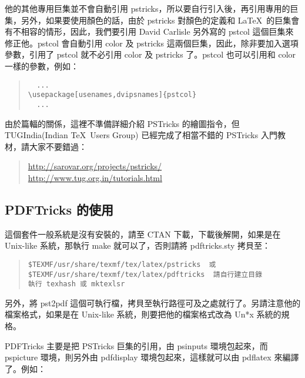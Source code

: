 他的其他專用巨集並不會自動引用 {\sffamily pstricks}，所以要自行引入後，再引用專用的巨集，另外，如果要使用顏色的話，由於 {\sffamily pstricks} 對顏色的定義和 \LaTeX\ 的巨集會有不相容的情形，因此，我們要引用 David Carlisle 另外寫的 {\sffamily pstcol} 這個巨集來修正他。{\sffamily pstcol} 會自動引用 {\sffamily color} 及 {\sffamily pstricks} 這兩個巨集，因此，除非要加入選項參數，引用了 {\sffamily pstcol} 就不必引用 {\sffamily color} 及 {\sffamily pstricks} 了。{\sffamily pstcol} 也可以引用和 {\sffamily color} 一樣的參數，例如：

\begin{quote}
  \begin{verbatim}
  ...
\usepackage[usenames,dvipsnames]{pstcol}
  ...
\end{verbatim}
\end{quote}

由於篇輻的關係，這裡不準備詳細介紹 {\sffamily PSTricks} 的繪圖指令，但 TUGIndia(Indian \TeX\ Users Group) 已經完成了相當不錯的 {\sffamily PSTricks} 入門教材，請大家不要錯過：

\begin{quote}
  \url{http://sarovar.org/projects/pstricks/}\\
  \url{http://www.tug.org.in/tutorials.html}
\end{quote}

\subsection{PDFTricks 的使用}

這個套件一般系統是沒有安裝的，請至 CTAN 下載，下載後解開，如果是在 Unix-like 系統，那執行 {\ttfamily make} 就可以了，否則請將 {\ttfamily pdftricks.sty} 拷貝至：

\begin{quote}
  \begin{verbatim}
$TEXMF/usr/share/texmf/tex/latex/pstricks  或
$TEXMF/usr/share/texmf/tex/latex/pdftricks  請自行建立目錄
執行 texhash 或 mktexlsr
\end{verbatim}
\end{quote}

另外，將 {\ttfamily pst2pdf} 這個可執行檔，拷貝至執行路徑可及之處就行了。另請注意他的檔案格式，如果是在 Unix-like 系統，則要把他的檔案格式改為 Un*x 系統的規格。

{\sffamily PDFTricks} 主要是把 {\sffamily PSTricks} 巨集的引用，由 {\ttfamily psinputs} 環境包起來，而 {\ttfamily pspicture} 環境，則另外由 {\ttfamily pdfdisplay} 環境包起來，這樣就可以由 {\ttfamily pdflatex} 來編譯了。例如：

